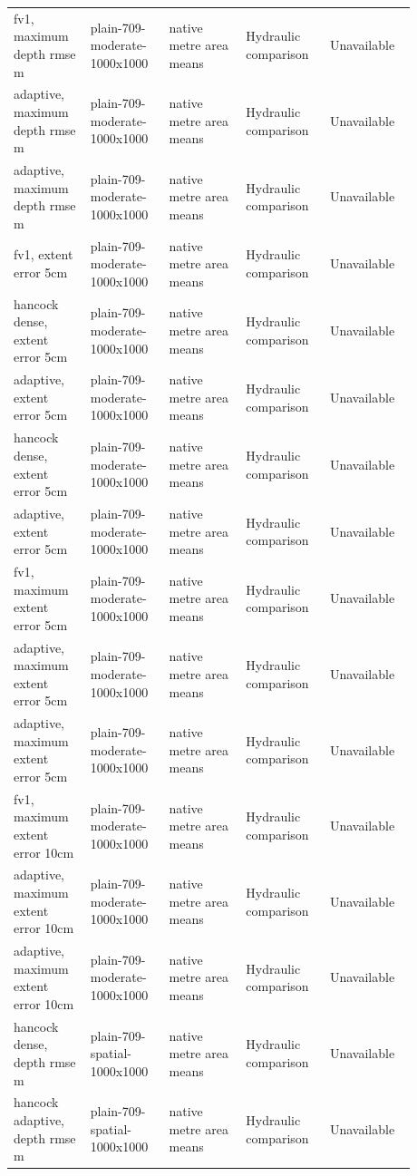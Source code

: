 \begin{longtable}{p{0.1760\linewidth}p{0.1760\linewidth}p{0.1760\linewidth}p{0.1760\linewidth}p{0.1760\linewidth}}
fv1, maximum depth rmse m & plain-709-moderate-1000x1000 & native metre area means & Hydraulic comparison & Unavailable \\
adaptive, maximum depth rmse m & plain-709-moderate-1000x1000 & native metre area means & Hydraulic comparison & Unavailable \\
adaptive, maximum depth rmse m & plain-709-moderate-1000x1000 & native metre area means & Hydraulic comparison & Unavailable \\
fv1, extent error 5cm & plain-709-moderate-1000x1000 & native metre area means & Hydraulic comparison & Unavailable \\
hancock dense, extent error 5cm & plain-709-moderate-1000x1000 & native metre area means & Hydraulic comparison & Unavailable \\
adaptive, extent error 5cm & plain-709-moderate-1000x1000 & native metre area means & Hydraulic comparison & Unavailable \\
hancock dense, extent error 5cm & plain-709-moderate-1000x1000 & native metre area means & Hydraulic comparison & Unavailable \\
adaptive, extent error 5cm & plain-709-moderate-1000x1000 & native metre area means & Hydraulic comparison & Unavailable \\
fv1, maximum extent error 5cm & plain-709-moderate-1000x1000 & native metre area means & Hydraulic comparison & Unavailable \\
adaptive, maximum extent error 5cm & plain-709-moderate-1000x1000 & native metre area means & Hydraulic comparison & Unavailable \\
adaptive, maximum extent error 5cm & plain-709-moderate-1000x1000 & native metre area means & Hydraulic comparison & Unavailable \\
fv1, maximum extent error 10cm & plain-709-moderate-1000x1000 & native metre area means & Hydraulic comparison & Unavailable \\
adaptive, maximum extent error 10cm & plain-709-moderate-1000x1000 & native metre area means & Hydraulic comparison & Unavailable \\
adaptive, maximum extent error 10cm & plain-709-moderate-1000x1000 & native metre area means & Hydraulic comparison & Unavailable \\
hancock dense, depth rmse m & plain-709-spatial-1000x1000 & native metre area means & Hydraulic comparison & Unavailable \\
hancock adaptive, depth rmse m & plain-709-spatial-1000x1000 & native metre area means & Hydraulic comparison & Unavailable \\

\end{longtable}
